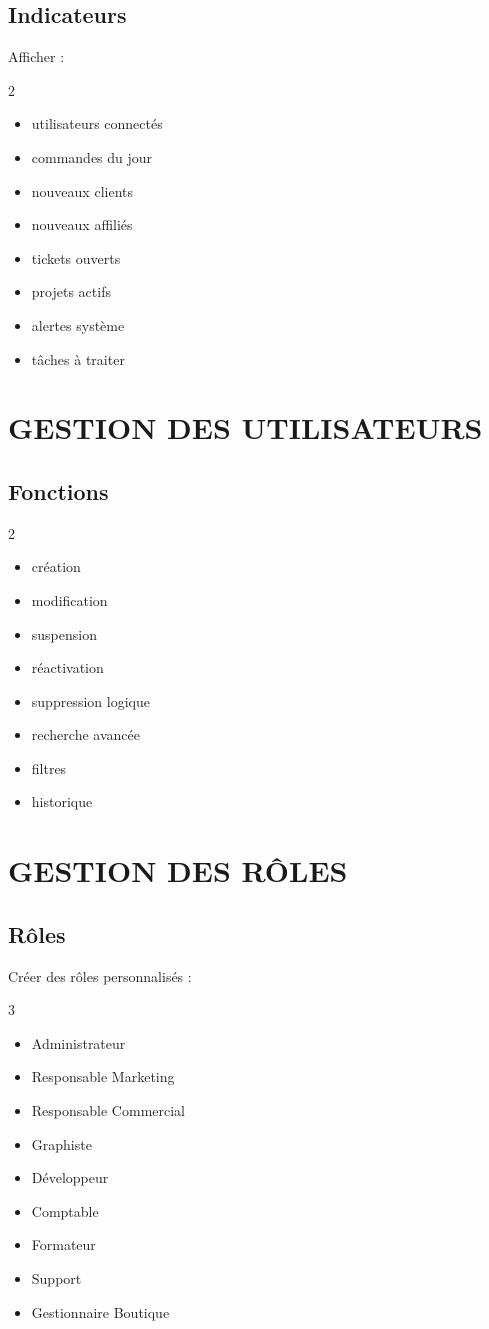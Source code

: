 \documentclass[12pt,a4paper,oneside]{book}
\begin{document}
\section{Indicateurs}
Afficher :
\begin{multicols}{2}
\begin{itemize}
\item utilisateurs connectés
\item commandes du jour
\item nouveaux clients
\item nouveaux affiliés
\item tickets ouverts
\item projets actifs
\item alertes système
\item tâches à traiter
\end{itemize}
\end{multicols}

\chapter{GESTION DES UTILISATEURS}

\section{Fonctions}
\begin{multicols}{2}
\begin{itemize}
\item création
\item modification
\item suspension
\item réactivation
\item suppression logique
\item recherche avancée
\item filtres
\item historique
\end{itemize}
\end{multicols}

\chapter{GESTION DES RÔLES}

\section{Rôles}
Créer des rôles personnalisés :
\begin{multicols}{3}
\begin{itemize}
\item Administrateur
\item Responsable Marketing
\item Responsable Commercial
\item Graphiste
\item Développeur
\item Comptable
\item Formateur
\item Support
\item Gestionnaire Boutique
\end{itemize}
\end{multicols}
\end{document}
